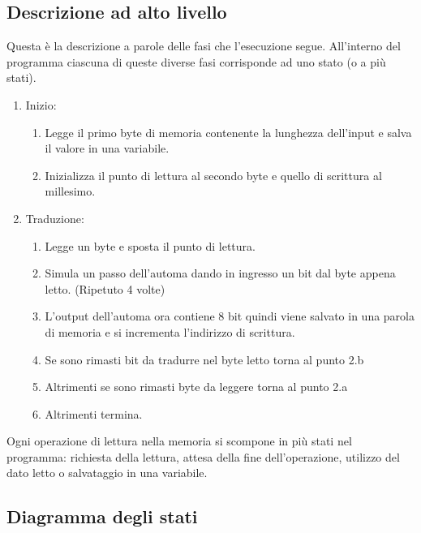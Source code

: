 \documentclass{article}
\begin{document}
\subsection{Descrizione ad alto livello}
Questa è la descrizione a parole delle fasi che l'esecuzione segue. All'interno del programma ciascuna di queste diverse fasi corrisponde ad uno stato (o a più stati).

\begin{enumerate}
	\item Inizio:
	\begin{enumerate}
		\item Legge il primo byte di memoria contenente la lunghezza dell'input e salva il valore in una variabile.
		\item Inizializza il punto di lettura al secondo byte e quello di scrittura al millesimo.
	\end{enumerate}
	\item Traduzione:
	\begin{enumerate}
		\item Legge un byte e sposta il punto di lettura.
		\item Simula un passo dell'automa dando in ingresso un bit dal byte appena letto. (Ripetuto 4 volte)
		\item L'output dell'automa ora contiene 8 bit quindi viene salvato in una parola di memoria e si incrementa l'indirizzo di scrittura.
		\item Se sono rimasti bit da tradurre nel byte letto torna al punto 2.b
		\item Altrimenti se sono rimasti byte da leggere torna al punto 2.a
		\item Altrimenti termina.
	\end{enumerate}
\end{enumerate}

Ogni operazione di lettura nella memoria si scompone in più stati nel programma: richiesta della lettura, attesa della fine dell'operazione, utilizzo del dato letto o salvataggio in una variabile. 

\subsection{Diagramma degli stati}
\end{document}
